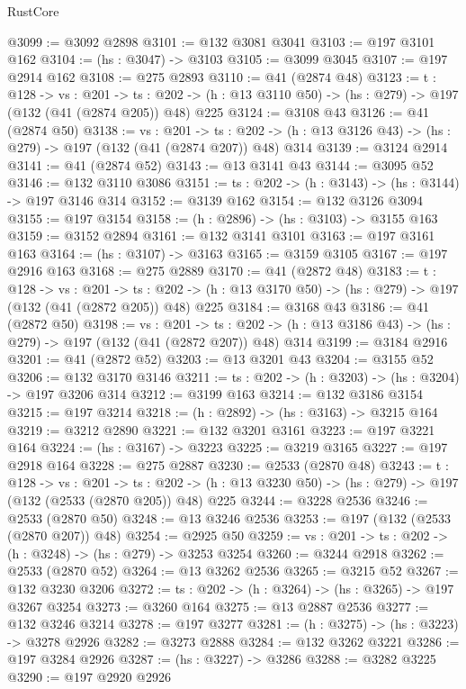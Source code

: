 \begin{lexlean}{RustCore}
\begin{coremodule}
@3099 := @3092 @2898
@3101 := @132 @3081 @3041
@3103 := @197 @3101 @162
@3104 := (hs : @3047) -> @3103
@3105 := @3099 @3045
@3107 := @197 @2914 @162
@3108 := @275 @2893
@3110 := @41 (@2874 @48)
@3123 := {t : @128} ->
  {vs : @201} ->
  {ts : @202} -> (h : @13 @3110 @50) -> (hs : @279) -> @197 (@132 (@41 (@2874 @205)) @48) @225
@3124 := @3108 @43
@3126 := @41 (@2874 @50)
@3138 := {vs : @201} ->
  {ts : @202} -> (h : @13 @3126 @43) -> (hs : @279) -> @197 (@132 (@41 (@2874 @207)) @48) @314
@3139 := @3124 @2914
@3141 := @41 (@2874 @52)
@3143 := @13 @3141 @43
@3144 := @3095 @52
@3146 := @132 @3110 @3086
@3151 := {ts : @202} -> (h : @3143) -> (hs : @3144) -> @197 @3146 @314
@3152 := @3139 @162
@3154 := @132 @3126 @3094
@3155 := @197 @3154
@3158 := (h : @2896) -> (hs : @3103) -> @3155 @163
@3159 := @3152 @2894
@3161 := @132 @3141 @3101
@3163 := @197 @3161 @163
@3164 := (hs : @3107) -> @3163
@3165 := @3159 @3105
@3167 := @197 @2916 @163
@3168 := @275 @2889
@3170 := @41 (@2872 @48)
@3183 := {t : @128} ->
  {vs : @201} ->
  {ts : @202} -> (h : @13 @3170 @50) -> (hs : @279) -> @197 (@132 (@41 (@2872 @205)) @48) @225
@3184 := @3168 @43
@3186 := @41 (@2872 @50)
@3198 := {vs : @201} ->
  {ts : @202} -> (h : @13 @3186 @43) -> (hs : @279) -> @197 (@132 (@41 (@2872 @207)) @48) @314
@3199 := @3184 @2916
@3201 := @41 (@2872 @52)
@3203 := @13 @3201 @43
@3204 := @3155 @52
@3206 := @132 @3170 @3146
@3211 := {ts : @202} -> (h : @3203) -> (hs : @3204) -> @197 @3206 @314
@3212 := @3199 @163
@3214 := @132 @3186 @3154
@3215 := @197 @3214
@3218 := (h : @2892) -> (hs : @3163) -> @3215 @164
@3219 := @3212 @2890
@3221 := @132 @3201 @3161
@3223 := @197 @3221 @164
@3224 := (hs : @3167) -> @3223
@3225 := @3219 @3165
@3227 := @197 @2918 @164
@3228 := @275 @2887
@3230 := @2533 (@2870 @48)
@3243 := {t : @128} ->
  {vs : @201} ->
  {ts : @202} -> (h : @13 @3230 @50) -> (hs : @279) -> @197 (@132 (@2533 (@2870 @205)) @48) @225
@3244 := @3228 @2536
@3246 := @2533 (@2870 @50)
@3248 := @13 @3246 @2536
@3253 := @197 (@132 (@2533 (@2870 @207)) @48)
@3254 := @2925 @50
@3259 := {vs : @201} -> {ts : @202} -> (h : @3248) -> (hs : @279) -> @3253 @3254
@3260 := @3244 @2918
@3262 := @2533 (@2870 @52)
@3264 := @13 @3262 @2536
@3265 := @3215 @52
@3267 := @132 @3230 @3206
@3272 := {ts : @202} -> (h : @3264) -> (hs : @3265) -> @197 @3267 @3254
@3273 := @3260 @164
@3275 := @13 @2887 @2536
@3277 := @132 @3246 @3214
@3278 := @197 @3277
@3281 := (h : @3275) -> (hs : @3223) -> @3278 @2926
@3282 := @3273 @2888
@3284 := @132 @3262 @3221
@3286 := @197 @3284 @2926
@3287 := (hs : @3227) -> @3286
@3288 := @3282 @3225
@3290 := @197 @2920 @2926

\end{coremodule}
\end{lexlean}
